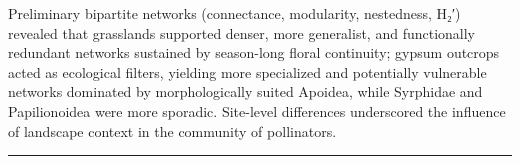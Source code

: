 \documentclass[
  letterpaper,
  DIV=11,
  numbers=noendperiod]{scrartcl}
\begin{document}
Preliminary bipartite networks (connectance, modularity, nestedness,
H₂′) revealed that grasslands supported denser, more generalist, and
functionally redundant networks sustained by season-long floral
continuity; gypsum outcrops acted as ecological filters, yielding more
specialized and potentially vulnerable networks dominated by
morphologically suited Apoidea, while Syrphidae and Papilionoidea were
more sporadic. Site-level differences underscored the influence of
landscape context in the community of pollinators.

\begin{center}\rule{0.5\linewidth}{0.5pt}\end{center}
\end{document}
